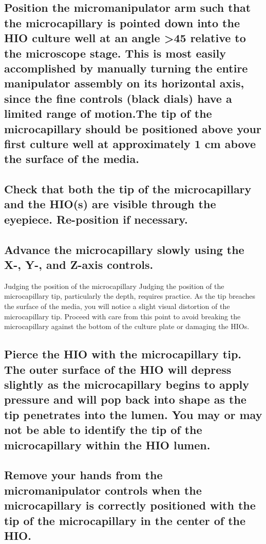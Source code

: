 \documentclass[11pt]{article}
\begin{document}
\subsection{{\bfseries\sffamily } Position the micromanipulator arm such that the microcapillary is pointed down into the HIO culture well at an angle >45\textdegree{} relative to the microscope stage. This is most easily accomplished by manually turning the entire manipulator assembly on its horizontal axis, since the fine controls (black dials) have a limited range of motion.The tip of the microcapillary should be positioned above your first culture well at approximately 1 cm above the surface of the media.}
\label{sec:orgheadline47}
\subsection{{\bfseries\sffamily } Check that both the tip of the microcapillary and the HIO(s) are visible through the eyepiece. Re-position if necessary.}
\label{sec:orgheadline48}
\subsection{{\bfseries\sffamily } Advance the microcapillary slowly using the X-, Y-, and Z-axis controls.}
\label{sec:orgheadline49}
\begin{bclogo}[logo=\bcinfo, couleurBarre=Black, noborder=true, couleur=gray!10]{     Judging the position of the microcapillary}
Judging the position of the microcapillary tip, particularly the depth, requires practice. As the tip breaches the surface of the media, you will notice a slight visual distortion of the microcapillary tip. Proceed with care from this point to avoid breaking the microcapillary against the bottom of the culture plate or damaging the HIOs.\\
\end{bclogo}
\subsection{{\bfseries\sffamily } Pierce the HIO with the microcapillary tip. The outer surface of the HIO will depress slightly as the microcapillary begins to apply pressure and will pop back into shape as the tip penetrates into the lumen. You may or may not be able to identify the tip of the microcapillary within the HIO lumen.}
\label{sec:orgheadline50}
\subsection{{\bfseries\sffamily } Remove your hands from the micromanipulator controls when the microcapillary is correctly positioned with the tip of the microcapillary in the center of the HIO.}
\label{sec:orgheadline51}
\end{document}
